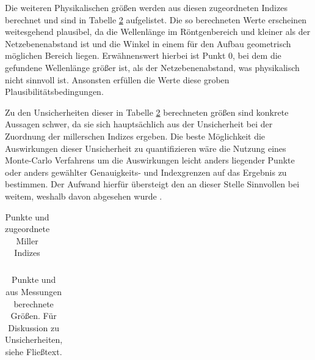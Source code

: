 

Die weiteren Physikalischen größen werden aus diesen zugeordneten Indizes berechnet und sind in Tabelle \ref{tab:laue_2} aufgelistet. Die so berechneten Werte erscheinen weitesgehend plausibel, da die Wellenlänge im Röntgenbereich und kleiner als der Netzebenenabstand ist und die Winkel in einem für den Aufbau geometrisch möglichen Bereich liegen. Erwähnenswert hierbei ist Punkt 0, bei dem die gefundene Wellenlänge größer ist, als der Netzebenenabstand, was physikalisch nicht sinnvoll ist. Ansonsten erfüllen die Werte diese groben Plausibilitätsbedingungen.

Zu den Unsicherheiten dieser in Tabelle \ref{tab:laue_2} berechneten größen sind konkrete Aussagen schwer, da sie sich hauptsächlich aus der Unsicherheit bei der Zuordnung der millerschen Indizes ergeben. Die beste Möglichkeit die Auswirkungen dieser Unsicherheit zu quantifizieren wäre die Nutzung eines Monte-Carlo Verfahrens um die Auswirkungen leicht anders liegender Punkte oder anders gewählter Genauigkeits- und Indexgrenzen auf das Ergebnis zu bestimmen. Der Aufwand hierfür übersteigt den an dieser Stelle Sinnvollen bei weitem, weshalb davon abgesehen wurde .


\begin{table}[H]
	\centering
	\begin{tabular}{|c|c|c|c|c|c|} \hline
		
	\end{tabular}
	\caption{Punkte und zugeordnete Miller Indizes}
	\label{tab:laue_1}
\end{table}

\begin{table}[H]
	\centering
	\begin{tabular}{|c|c|c|c|} \hline
		
	\end{tabular}
	\caption{Punkte und aus Messungen berechnete Größen. Für Diskussion zu Unsicherheiten, siehe Fließtext.}
	\label{tab:laue_2}
\end{table}
